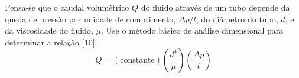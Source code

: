 Pensa-se que o caudal volumétrico $Q$ do fluido através de um tubo depende da queda de pressão por unidade de comprimento, $\Delta p / l$, do diâmetro do tubo, $d$, e da viscosidade do fluido, $\mu$. Use o método básico de análise dimensional para determinar a relação [10]:
\begin{equation}
    Q = (\text{constante}) \left(\frac{d^4}{\mu}\right) \left(\frac{\Delta p}{l}\right)
\end{equation}
